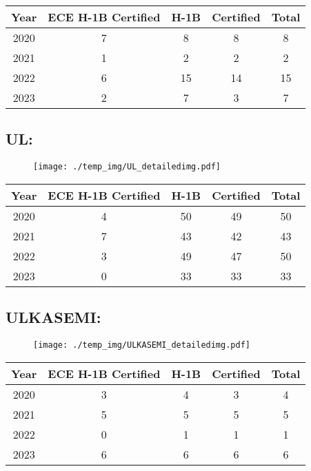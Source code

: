 \documentclass{article}%
\begin{document}
%
\begin{longtable}{c|c|c|c|c}%
\hline%
Year&ECE H{-}1B Certified&H{-}1B&Certified&Total\\%
\hline%
2020&7&8&8&8\\%
\hline%
2021&1&2&2&2\\%
\hline%
2022&6&15&14&15\\%
\hline%
2023&2&7&3&7\\%
\hline%
\end{longtable}

%
\newpage%
\subsection{UL:}%
\label{subsec:UL}%
\label{ULdetailed}%


\begin{figure}[htbp]%
\centering%
\texttt{[image: ./temp\_img/UL\_detailedimg.pdf]}%
\end{figure}

%
\begin{longtable}{c|c|c|c|c}%
\hline%
Year&ECE H{-}1B Certified&H{-}1B&Certified&Total\\%
\hline%
2020&4&50&49&50\\%
\hline%
2021&7&43&42&43\\%
\hline%
2022&3&49&47&50\\%
\hline%
2023&0&33&33&33\\%
\hline%
\end{longtable}

%
\newpage%
\subsection{ULKASEMI:}%
\label{subsec:ULKASEMI}%
\label{ULKASEMIdetailed}%


\begin{figure}[htbp]%
\centering%
\texttt{[image: ./temp\_img/ULKASEMI\_detailedimg.pdf]}%
\end{figure}

%
\begin{longtable}{c|c|c|c|c}%
\hline%
Year&ECE H{-}1B Certified&H{-}1B&Certified&Total\\%
\hline%
2020&3&4&3&4\\%
\hline%
2021&5&5&5&5\\%
\hline%
2022&0&1&1&1\\%
\hline%
2023&6&6&6&6\\%
\hline%
\end{longtable}
\end{document}
